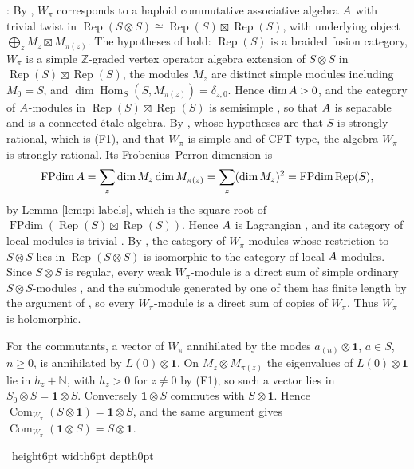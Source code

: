 \documentclass[leqno]{article}
\newcommand{\N}{\ensuremath{\mathbb{N}}}
\let\cal\relax
\newcommand{\cal}{\mathcal}
\newcommand{\Z}{\ensuremath{\mathbb{Z}}}
\renewcommand{\geq}{\ensuremath{\geqslant}}
\newcommand{\qed}{\hfill \vrule height6pt  width6pt depth0pt}
\newcommand{\ot}{\otimes}
\DeclareMathOperator{\Rep}{Rep}
\newenvironment{proof}[1][]{\noindent {\it Proof #1} : }{\hbox{~}\qed
\smallskip
}
\numberwithin{equation}{section}
\begin{document}
\begin{proof}
By \cite[Theorem 3.2 p.~10]{HKL15}, $W_\pi$ corresponds to a haploid commutative associative algebra $\cal A$ with trivial twist in $\Rep(S \ot S) \cong \Rep(S) \boxtimes \Rep(S)$, with underlying object $\bigoplus_z M_z \boxtimes M_{\pi(z)}$. The hypotheses of \cite[Theorem 5.12 p.~52]{CKM22} hold: $\Rep(S)$ is a braided fusion category, $W_\pi$ is a simple $\Z$-graded vertex operator algebra extension of $S \ot S$ in $\Rep(S) \boxtimes \Rep(S)$, the modules $M_z$ are distinct simple modules including $M_0 = S$, and $\dim\operatorname{Hom}_S(S,M_{\pi(z)}) = \delta_{z,0}$. Hence $\dim\cal A > 0$, and the category of $\cal A$-modules in $\Rep(S) \boxtimes \Rep(S)$ is semisimple \cite[Theorem 5.12 p.~52 and its proof]{CKM22}, so that $\cal A$ is separable \cite[Proposition 2.7 p.~5]{DMNO13} and is a connected étale algebra. By \cite[Corollary 5.13 p.~53]{CKM22}, whose hypotheses are that $S$ is strongly rational, which is (F1), and that $W_\pi$ is simple and of CFT type, the algebra $W_\pi$ is strongly rational. Its Frobenius--Perron dimension is
\[
\operatorname{FPdim}\cal A = \sum_z \dim M_z\dim M_{\pi(z)} = \sum_z (\dim M_z)^2 = \operatorname{FPdim}\Rep(S),
\]
by Lemma \ref{lem:pi-labels}, which is the square root of $\operatorname{FPdim}(\Rep(S) \boxtimes \Rep(S))$. Hence $\cal A$ is Lagrangian \cite[Definition 4.6 p.~17]{DMNO13}, and its category of local modules is trivial \cite[Remark 4.3 p.~16]{DMNO13}. By \cite[Theorem 3.4 p.~16]{HKL15}, the category of $W_\pi$-modules whose restriction to $S \ot S$ lies in $\Rep(S \ot S)$ is isomorphic to the category of local $\cal A$-modules. Since $S \ot S$ is regular, every weak $W_\pi$-module is a direct sum of simple ordinary $S \ot S$-modules \cite[Theorem 4.5]{ABD04}, and the submodule generated by one of them has finite length by the argument of \cite[proof of Theorem 12.3]{Arh26}, so every $W_\pi$-module is a direct sum of copies of $W_\pi$. Thus $W_\pi$ is holomorphic.

For the commutants, a vector of $W_\pi$ annihilated by the modes $a_{(n)} \ot \mathbf 1$, $a \in S$, $n \geq 0$, is annihilated by $L(0) \ot \mathbf 1$. On $M_z \ot M_{\pi(z)}$ the eigenvalues of $L(0) \ot \mathbf 1$ lie in $h_z+\N$, with $h_z > 0$ for $z \neq 0$ by (F1), so such a vector lies in $S_0 \ot S = \mathbf 1 \ot S$. Conversely $\mathbf 1 \ot S$ commutes with $S \ot \mathbf 1$. Hence $\operatorname{Com}_{W_\pi}(S \ot \mathbf 1) = \mathbf 1 \ot S$, and the same argument gives $\operatorname{Com}_{W_\pi}(\mathbf 1 \ot S) = S \ot \mathbf 1$.


\end{proof}
\end{document}
